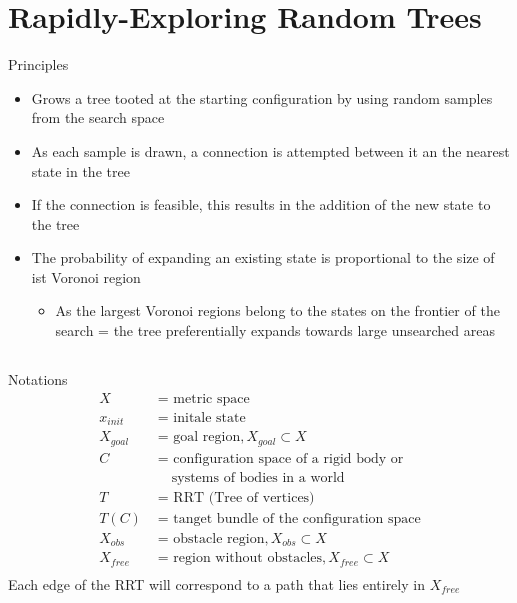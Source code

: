 \documentclass[%
  professionalfonts,%
  xcolor={%
    usenames,%
    dvipsnames,%
    svgnames,%
    table,%
    hyperref%
  }%
]{beamer}
\begin{document}
    \section{Rapidly-Exploring Random Trees}
      \begin{frame}
        \huge{}
      \end{frame}
      
      \begin{frame}{Principles}
        \begin{itemize}
          \item Grows a tree tooted at the starting configuration by using random samples from the search space
          \item As each sample is drawn, a connection is attempted between it an the nearest state in the tree
          \item If the connection is feasible, this results in the addition of the new state to the tree
          \item The probability of expanding an existing state is proportional to the size of ist Voronoi region
          \begin{itemize}
            \item As the largest Voronoi regions belong to the states on the frontier of the search = the tree preferentially expands towards large unsearched areas
          \end{itemize}
        \end{itemize}
      \end{frame}
      
      \subsection*{}
        \begin{frame}{Notations}
          \begin{align*}
          X        & \text{ = metric space}\\
          x_{init} & \text{ = initale state}\\
          X_{goal} & \text{ = goal region},  X_{goal} \subset X\\
          C        & \text{ = configuration space of a rigid body or}\\
          & \text{ ~~ systems of bodies in a world}\\
          T        & \text{ = RRT (Tree of vertices)}\\
          T(C)     & \text{ = tanget bundle of the configuration space}\\
          X_{obs}  & \text{ = obstacle region},  X_{obs} \subset X\\
          X_{free} & \text{ = region without obstacles}, X_{free} \subset X\\
          \end{align*}
          Each edge of the RRT will correspond to a path that lies entirely in $X_{free}$
        \end{frame}
      
\end{document}
